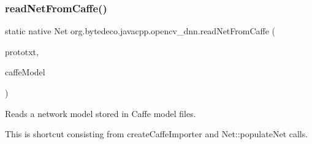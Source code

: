 \subsubsection{\texorpdfstring{read\+Net\+From\+Caffe()}{readNetFromCaffe()}}
{\footnotesize\ttfamily static native Net org.\+bytedeco.\+javacpp.\+opencv\+\_\+dnn.\+read\+Net\+From\+Caffe (\begin{DoxyParamCaption}\item[{@Str Byte\+Pointer}]{prototxt,  }\item[{@Str Byte\+Pointer}]{caffe\+Model }\end{DoxyParamCaption})\hspace{0.3cm}{\ttfamily [static]}}



Reads a network model stored in Caffe model files. 

This is shortcut consisting from create\+Caffe\+Importer and Net\+::populate\+Net calls. 